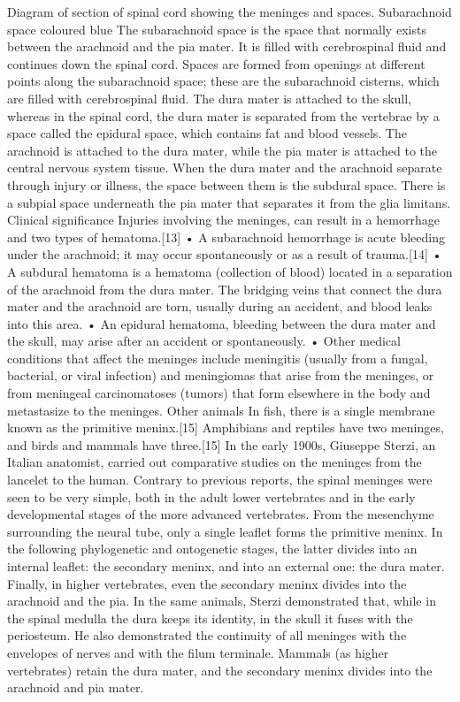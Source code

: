  
Diagram of section of spinal cord showing the meninges and spaces. Subarachnoid space coloured blue
The subarachnoid space is the space that normally exists between the arachnoid and the pia mater. It is filled with cerebrospinal fluid and continues down the spinal cord. Spaces are formed from openings at different points along the subarachnoid space; these are the subarachnoid cisterns, which are filled with cerebrospinal fluid.
The dura mater is attached to the skull, whereas in the spinal cord, the dura mater is separated from the vertebrae by a space called the epidural space, which contains fat and blood vessels. The arachnoid is attached to the dura mater, while the pia mater is attached to the central nervous system tissue. When the dura mater and the arachnoid separate through injury or illness, the space between them is the subdural space. There is a subpial space underneath the pia mater that separates it from the glia limitans.
Clinical significance
Injuries involving the meninges, can result in a hemorrhage and two types of hematoma.[13]
•   A subarachnoid hemorrhage is acute bleeding under the arachnoid; it may occur spontaneously or as a result of trauma.[14]
•   A subdural hematoma is a hematoma (collection of blood) located in a separation of the arachnoid from the dura mater. The bridging veins that connect the dura mater and the arachnoid are torn, usually during an accident, and blood leaks into this area.
•   An epidural hematoma, bleeding between the dura mater and the skull, may arise after an accident or spontaneously.
•    
Other medical conditions that affect the meninges include meningitis (usually from a fungal, bacterial, or viral infection) and meningiomas that arise from the meninges, or from meningeal carcinomatoses (tumors) that form elsewhere in the body and metastasize to the meninges.
Other animals
In fish, there is a single membrane known as the primitive meninx.[15] Amphibians and reptiles have two meninges, and birds and mammals have three.[15] In the early 1900s, Giuseppe Sterzi, an Italian anatomist, carried out comparative studies on the meninges from the lancelet to the human. Contrary to previous reports, the spinal meninges were seen to be very simple, both in the adult lower vertebrates and in the early developmental stages of the more advanced vertebrates. From the mesenchyme surrounding the neural tube, only a single leaflet forms the primitive meninx. In the following phylogenetic and ontogenetic stages, the latter divides into an internal leaflet: the secondary meninx, and into an external one: the dura mater. Finally, in higher vertebrates, even the secondary meninx divides into the arachnoid and the pia. In the same animals, Sterzi demonstrated that, while in the spinal medulla the dura keeps its identity, in the skull it fuses with the periosteum. He also demonstrated the continuity of all meninges with the envelopes of nerves and with the filum terminale.
Mammals (as higher vertebrates) retain the dura mater, and the secondary meninx divides into the arachnoid and pia mater.


